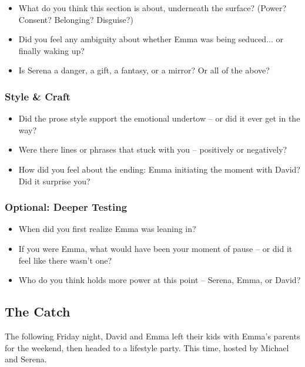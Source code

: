 \begin{itemize}
  \item What do you think this section is about, underneath the surface? (Power? Consent? Belonging? Disguise?)
  \item Did you feel any ambiguity about whether Emma was being seduced... or finally waking up?
  \item Is Serena a danger, a gift, a fantasy, or a mirror? Or all of the above?
\end{itemize}

\subsubsection{Style \& Craft}

\begin{itemize}
  \item Did the prose style support the emotional undertow -- or did it ever get in the way?
  \item Were there lines or phrases that stuck with you -- positively or negatively?
  \item How did you feel about the ending: Emma initiating the moment with David? Did it surprise you?
\end{itemize}

\subsubsection{Optional: Deeper Testing}

\begin{itemize}
  \item When did you first realize Emma was leaning in?
  \item If you were Emma, what would have been your moment of pause -- or did it feel like there wasn’t one?
  \item Who do you think holds more power at this point -- Serena, Emma, or David?
\end{itemize}







\subsection{The Catch}

The following Friday night, David and Emma left their kids with Emma's parents for the weekend,
then headed to a lifestyle party. This time, hosted by Michael and Serena.

